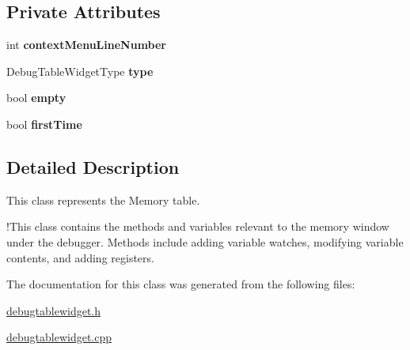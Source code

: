 \subsection*{Private Attributes}
\begin{DoxyCompactItemize}
\item 
\hypertarget{class_debug_table_widget_aeed4234d2e5094f6af154e0a65916f71}{}int {\bfseries context\+Menu\+Line\+Number}\label{class_debug_table_widget_aeed4234d2e5094f6af154e0a65916f71}

\item 
\hypertarget{class_debug_table_widget_acb026ff25f4f9cd6023701b0364abeac}{}Debug\+Table\+Widget\+Type {\bfseries type}\label{class_debug_table_widget_acb026ff25f4f9cd6023701b0364abeac}

\item 
\hypertarget{class_debug_table_widget_a0257a292e3dd8583b6e9294a7df1b7c0}{}bool {\bfseries empty}\label{class_debug_table_widget_a0257a292e3dd8583b6e9294a7df1b7c0}

\item 
\hypertarget{class_debug_table_widget_a1221dfd2571c4ae8c344a3d71a4953e4}{}bool {\bfseries first\+Time}\label{class_debug_table_widget_a1221dfd2571c4ae8c344a3d71a4953e4}

\end{DoxyCompactItemize}


\subsection{Detailed Description}
This class represents the Memory table. 

!\+This class contains the methods and variables relevant to the memory window under the debugger. Methods include adding variable watches, modifying variable contents, and adding registers. 

The documentation for this class was generated from the following files\+:\begin{DoxyCompactItemize}
\item 
\hyperlink{debugtablewidget_8h}{debugtablewidget.\+h}\item 
\hyperlink{debugtablewidget_8cpp}{debugtablewidget.\+cpp}\end{DoxyCompactItemize}
